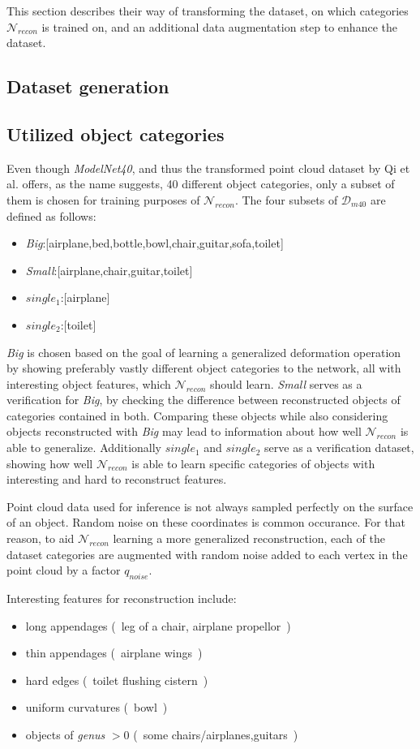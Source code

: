    This section describes their way of transforming the dataset, on which categories
   $\mathcal{N}_{recon}$ is trained on, and an additional data augmentation step to
   enhance the dataset.

\subsection{Dataset generation}
\subsection{Utilized object categories}
\label{sec:categ}
Even though \emph{ModelNet40}, and thus the transformed point cloud dataset by Qi et al. offers, as the name suggests,
40 different object categories, only a subset of them is chosen for training purposes of $\mathcal{N}_{recon}$. 
The four subsets of $\mathcal{D}_{m40}$ are defined as follows:
\begin{itemize}
   \item \emph{Big}:[airplane,bed,bottle,bowl,chair,guitar,sofa,toilet]
   \item \emph{Small}:[airplane,chair,guitar,toilet]
   \item \emph{$single_1$}:[airplane]
   \item \emph{$single_2$}:[toilet]
\end{itemize}
\emph{Big} is chosen based on the goal of learning a generalized deformation operation by showing preferably vastly different object categories
to the network, all with interesting object features, which $\mathcal{N}_{recon}$ should learn.
\emph{Small} serves as a verification for \emph{Big}, by checking the difference between reconstructed objects of categories contained in both.
Comparing these objects while also considering objects reconstructed with \emph{Big} may lead to information about how well $\mathcal{N}_{recon}$ is
able to generalize. 
Additionally $single_1$ and $single_2$ serve as a verification dataset, showing how well $\mathcal{N}_{recon}$ is able to learn specific categories of 
objects with interesting and hard to reconstruct features.

Point cloud data used for inference is not always sampled perfectly on the surface of an object. Random noise on these coordinates is common occurance.
For that reason, to aid $\mathcal{N}_{recon}$ learning a more generalized reconstruction, each of the dataset categories are
 augmented with random noise added to each vertex in the point cloud by a factor $q_{noise}$.

 Interesting features for reconstruction include:
 \begin{itemize}
   \item long appendages (~leg of a chair, airplane propellor~)
   \item thin appendages (~airplane wings~)
   \item hard edges (~toilet flushing cistern~)
   \item uniform curvatures (~bowl~)
   \item objects of \emph{genus} $>0$ (~some chairs/airplanes,guitars~)
 \end{itemize}
